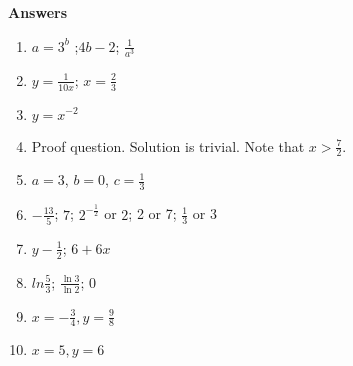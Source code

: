 \documentclass[14pt]{extarticle}
\begin{document}
\clearpage
\textbf{Answers}
\begin{enumerate}
    \item  $a = 3^b$ ;$4b -2$; $\frac{1}{a^3}$
    \item $y = \frac{1}{10x}$; $x = \frac{2}{3}$
    \item $y = x^{-2}$
    \item Proof question. Solution is trivial. Note that $x > \frac{7}{2}.$
    \item $a = 3$, $b = 0$, $c = \frac{1}{3}$
    \item $-\frac{13}{5}$; $ 7$;  $2^{-\frac{1}{2}}$ or $2$; 2 or 7; $\frac{1}{3}$ or 3
    \item $y -\frac{1}{2}$; $6+6x$
    \item $ln\frac{5}{3}$; $\frac{\ln3}{\ln 2}$; 0
    \item $x  = -\frac{3}{4}, y = \frac{9}{8}$
    \item $x =5, y = 6$
\end{enumerate}
\end{document}
